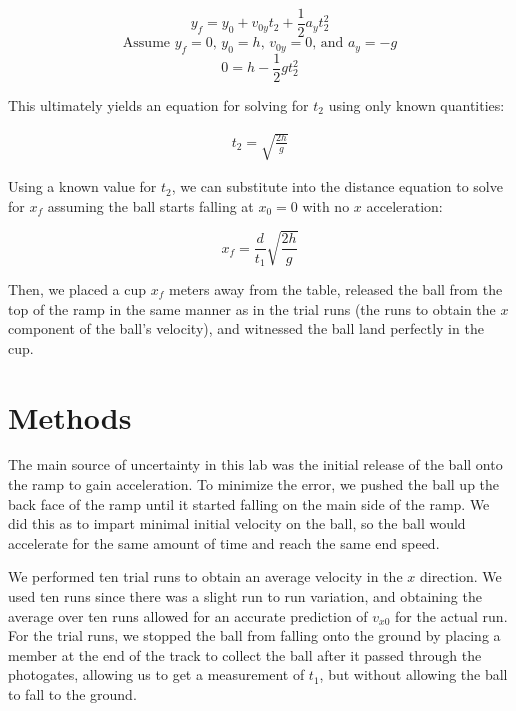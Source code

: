 \documentclass[12pt]{article}
\begin{document}
\begin{equation}
y_{f} = y_{0} + v_{0y}t_{2} + \frac{1}{2} a_{y}t_{2}^{2}
\end{equation}
\begin{equation}
\text{Assume } y_{f} = 0\text{, }y_{0} = h\text{, } v_{0y} = 0\text{, and } a_{y} = -g
\end{equation}
\begin{equation}
0 = h - \frac{1}{2} g t_{2}^{2}
\end{equation}

This ultimately yields an equation for solving for \(t_2\) using only known quantities:

\begin{align}
        t_{2} = \sqrt{\frac{2h}{g}}
\end{align}

Using a known value for \(t_2\), we can substitute into the distance equation to solve for \(x_{f}\) assuming the ball starts falling at \(x_0 = 0\) with no \(x\) acceleration:

\begin{equation} \label{xf-eqn}
x_{f} = \frac{d}{t_{1}}\sqrt{\frac{2h}{g}}
\end{equation}

Then, we placed a cup \(x_f\) meters away from the table, released the ball from the top of the ramp in the same manner as in the trial runs (the runs to obtain the \(x\) component of the ball's velocity), and witnessed the ball land perfectly in the cup.
\section{Methods}
\label{sec:org8ff81c0}

The main source of uncertainty in this lab was the initial release of the ball onto the ramp to gain acceleration. To minimize the error, we pushed the ball up the back face of the ramp until it started falling on the main side of the ramp. We did this as to impart minimal initial velocity on the ball, so the ball would accelerate for the same amount of time and reach the same end speed.

We performed ten trial runs to obtain an average velocity in the \(x\) direction. We used ten runs since there was a slight run to run variation, and obtaining the average over ten runs allowed for an accurate prediction of \(v_{x0}\) for the actual run. For the trial runs, we stopped the ball from falling onto the ground by placing a member at the end of the track to collect the ball after it passed through the photogates, allowing us to get a measurement of \(t_1\), but without allowing the ball to fall to the ground.
\end{document}
